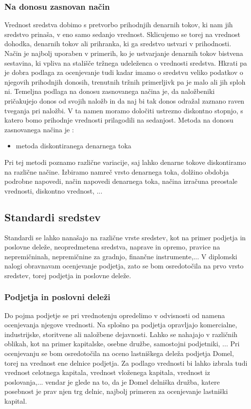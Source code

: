 \documentclass[12pt,a4paper]{amsart}
\theoremstyle{definition} %
\theoremstyle{plain} %
\begin{document}
\subsubsection{Na donosu zasnovan način}
Vrednost sredstva dobimo s pretvorbo prihodnjih denarnih tokov, ki nam jih sredstvo prinaša, v eno samo sedanjo vrednost. Sklicujemo se torej na vrednost dohodka, denarnih tokov ali prihranka, ki ga sredstvo ustvari v prihodnosti. Način je najbolj uporaben v primerih, ko je ustvarjanje denarnih tokov bistvena sestavina, ki vpliva na stališče tržnega udeleženca o vrednosti sredstva. Hkrati pa je dobra podlaga za ocenjevanje tudi kadar imamo o sredstvu veliko podatkov o njegovih prihodnjih donosih, trenutnih tržnih primerljivk pa je malo ali jih sploh ni. Temeljna podlaga na donosu zasnovanega načina je, da naložbeniki pričakujejo donos od svojih naložb in da naj bi tak donos odražal zaznano raven tveganja pri naložbi. V ta namen moramo določiti ustrezno diskontno stopnjo, s katero bomo prihodnje vrednosti prilagodili na sedanjost.
Metoda na donosu zasnovanega načina je :
\begin{itemize}
\item metoda diskontiranega denarnega toka
\end{itemize}
Pri tej metodi poznamo različne variacije, saj lahko denarne tokove diskontiramo na različne načine. Izbiramo namreč vrsto denarnega toka, dolžino obdobja podrobne napovedi, način napovedi denarnega toka, načina izračuna preostale vrednosti, diskontno vrednost, ... 

\subsection{Standardi sredstev}
Standardi se lahko nanašajo na različne vrste sredstev, kot na primer podjetja in poslovne deleže, neopredmetena sredstva, naprave in opremo, pravice na nepremičninah, nepremičnine za gradnjo, finančne instrumente,... V diplomski nalogi obravnavam ocenjevanje podjetja, zato se bom osredotočila na prvo vrsto sredstev, torej podjetja in poslovne deleže.
\subsubsection{Podjetja in poslovni deleži}
Do pojma podjetje se pri vrednotenju opredelimo v odvisnosti od namena ocenjevanja njegove vrednosti. Na splošno pa podjetja opravljajo komercialne, industrijske, storitvene ali naložbene dejavnosti. Lahko se nahajajo v različnih oblikah, kot na primer kapitalske, osebne družbe, samostojni podjetniki, ... Pri ocenjevanju se bom osredotočila na oceno lastniškega deleža podjetja Domel, torej na vrednost ene delnice podjetja. Za podlago vrednosti bi lahko izbrala tudi  vrednost celotnega kapitala, vrednost vloženega kapitala, vrednost iz poslovanja,... vendar je glede na to, da je Domel delniška družba, katere posebnost je prav njen trg delnic, najbolj primeren za ocenjevanje lastniški kapital.  
\end{document}
